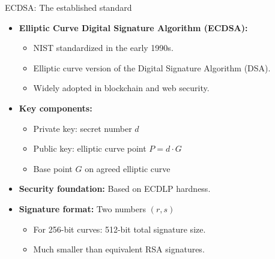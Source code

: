 \documentclass[aspectratio=169, lualatex, handout]{beamer}
\begin{document}
\begin{frame}{ECDSA: The established standard}
	\begin{itemize}
		\item \textbf{Elliptic Curve Digital Signature Algorithm (ECDSA):}
		      \begin{itemize}
			      \item NIST standardized in the early 1990s.
			      \item Elliptic curve version of the Digital Signature Algorithm (DSA).
			      \item Widely adopted in blockchain and web security.
		      \end{itemize}
		\item \textbf{Key components:}
		      \begin{itemize}
			      \item Private key: secret number $d$
			      \item Public key: elliptic curve point $P = d \cdot G$
			      \item Base point $G$ on agreed elliptic curve
		      \end{itemize}
		\item \textbf{Security foundation:} Based on ECDLP hardness.
		\item \textbf{Signature format:} Two numbers $(r, s)$
		      \begin{itemize}
			      \item For 256-bit curves: 512-bit total signature size.
			      \item Much smaller than equivalent RSA signatures.
		      \end{itemize}
	\end{itemize}
\end{frame}
\end{document}
